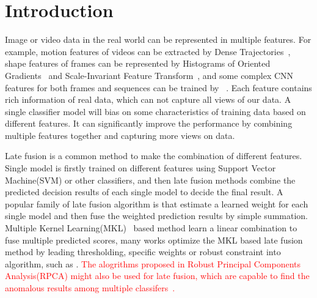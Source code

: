 \documentclass[letterpaper]{article}
\def\yanred{\textcolor{red}}
\begin{document}
\section{Introduction}

Image or video data in the real world can be represented in multiple features. For example, motion features of videos can be extracted by Dense Trajectories~\cite{Wang2011Action}, shape features of frames can be represented by Histograms of Oriented Gradients~\cite{dalal2005histograms} and Scale-Invariant Feature Transform~\cite{lowe2004distinctive}, and some complex CNN features for both frames and sequences can be trained by ~\cite{szegedy2015going,chatfield2014return,he2015deep,simonyan2014two,Xu_2015_CVPR}.
Each feature contains rich information of real data, which can not capture all views of our data. A single classifier model will bias on some characteristics of training data based on different features. It can significantly improve the performance by combining multiple features together and capturing more views on data.


Late fusion is a common method to make the combination of different features. Single model is firstly trained on different features using Support Vector Machine(SVM) or other classifiers, and then late fusion methods combine the predicted decision results of each single model to decide the final result.
A popular family of late fusion algorithm is that estimate a learned weight for each single model and then fuse the weighted prediction results by simple summation. Multiple Kernel Learning(MKL)~\cite{lanckriet2004learning,Rakotomamonjy2008Simplemkl} based method learn a linear combination to fuse multiple predicted scores, many works optimize the MKL based late fusion method by leading thresholding, specific weights or robust constraint into algorithm, such as \cite{gehler2009feature,xuiccv2013feature,lai2015learning}. 
\yanred{The alogrithms proposed in Robust Principal Components Analysis(RPCA) might also be used for late fusion, which are capable to find the anomalous results among multiple classifers~\cite{gaoijcai2016robust}. }
\end{document}
